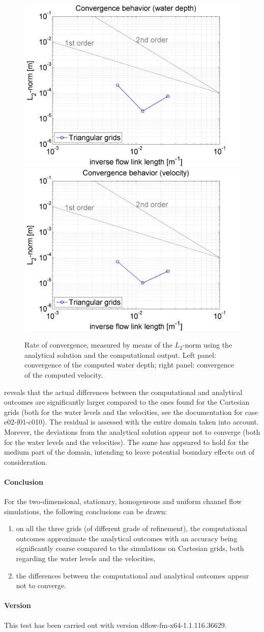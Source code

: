 \begin{figure}[h!]
\begin{center}
\includegraphics[width=0.48\columnwidth]{figures/hchannelconvergence.png}
\includegraphics[width=0.48\columnwidth]{figures/uchannelconvergence.png}
\end{center}\caption{Rate of convergence, measured by means of the $L_2$-norm using the analytical solution and the computational output. Left panel: convergence of the computed water depth; right panel: convergence of the computed velocity. \label{fig:chezytrianglesconvergence}}
\end{figure}

 reveals that the actual differences between the computational and analytical outcomes are significantly larger compared to the ones found for the Cartesian grids (both for the water levels and the velocities, see the documentation for case e02-f01-c010). The residual is assessed with the entire domain taken into account. Morever, the deviations from the analytical solution appear not to converge (both for the water levels and the velocities). The same has appeared to hold for the medium part of the domain, intending to leave potential boundary effects out of consideration. 



\paragraph*{Conclusion}
For the two-dimensional, stationary, homogeneous and uniform channel flow simulations, the following conclusions can be drawn:
\begin{enumerate}
\item on all the three grids (of different grade of refinement), the computational outcomes approximate the analytical outcomes with an accuracy being significantly coarse compared to the simulations on Cartesian grids, both regarding the water levels and the velocities,
\item the differences between the computational and analytical outcomes appear not to converge.
\end{enumerate}



\paragraph*{Version}
This test has been carried out with version dflow-fm-x64-1.1.116.36629.


